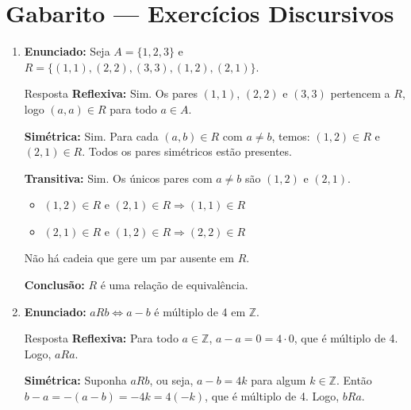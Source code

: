 \documentclass[12pt]{article}
\begin{document}
\vspace*{0.2cm}

\section*{Gabarito — Exercícios Discursivos}

\begin{enumerate}

\item \textbf{Enunciado:} Seja $A = \{1, 2, 3\}$ e $R = \{(1,1), (2,2), (3,3), (1,2), (2,1)\}$.

\begin{block}{Resposta}
\textbf{Reflexiva:} Sim. Os pares $(1,1)$, $(2,2)$ e $(3,3)$ pertencem a $R$, logo $(a,a) \in R$ para todo $a \in A$.

\textbf{Simétrica:} Sim. Para cada $(a,b) \in R$ com $a \neq b$, temos:
$(1,2) \in R$ e $(2,1) \in R$. Todos os pares simétricos estão presentes.

\textbf{Transitiva:} Sim. Os únicos pares com $a \neq b$ são $(1,2)$ e $(2,1)$.
\begin{itemize}
    \item $(1,2) \in R$ e $(2,1) \in R \Rightarrow (1,1) \in R$ \checkmark
    \item $(2,1) \in R$ e $(1,2) \in R \Rightarrow (2,2) \in R$ \checkmark
\end{itemize}
Não há cadeia que gere um par ausente em $R$.

\textbf{Conclusão:} $R$ é uma relação de equivalência.
\end{block}

\vspace{0.8cm}

\item \textbf{Enunciado:} $aRb \Leftrightarrow a - b$ é múltiplo de 4 em $\mathbb{Z}$.

\begin{block}{Resposta}
\textbf{Reflexiva:} Para todo $a \in \mathbb{Z}$, $a - a = 0 = 4 \cdot 0$, que é múltiplo de 4. Logo, $aRa$.

\textbf{Simétrica:} Suponha $aRb$, ou seja, $a - b = 4k$ para algum $k \in \mathbb{Z}$. Então $b - a = -(a-b) = -4k = 4(-k)$, que é múltiplo de 4. Logo, $bRa$.


\end{block}
\end{enumerate}
\end{document}
